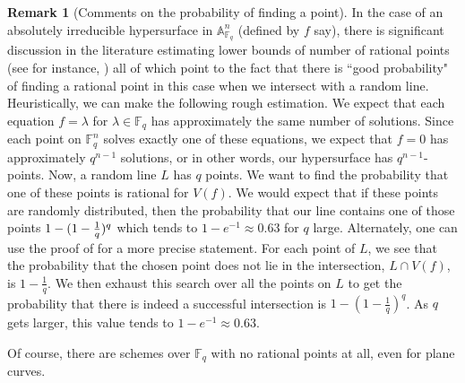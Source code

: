 \documentclass[11pt]{amsart}
\theoremstyle{definition}
\newtheorem{remark}{Remark}[subsection]
\newcommand{\bA}{\mathbb{A}}
\newcommand{\bF}{\mathbb{F}}
\begin{document}
\begin{remark}[Comments on the probability of finding a point]
	In the case of an absolutely irreducible hypersurface in $\bA^n_{\bF_q}$ (defined by $f$ say), there is significant discussion in the literature estimating lower bounds of number of rational points (see for instance, \cite{RationalKPointsSource,lang1954number,ghorpade2002number,cafure2006improved}) all of which point to the fact that there is ``good probability" of finding a rational point in this case when we intersect with a random line. Heuristically, we can make the following rough estimation.  We expect that each equation $f = \lambda$ for $\lambda \in \bF_q$ has approximately the same number of solutions.  Since each point on $\bF_q^n$ solves exactly one of these equations, we expect that $f = 0$ has approximately $q^{n-1}$ solutions, or in other words, our hypersurface has $q^{n-1}$-points.  
       Now, a random line $L$ has $q$ points. We want to find the probability that one of these points is  rational for $V(f)$.  We would expect that if these points are randomly distributed, then the probability that our line contains one of those points $1-(1-{1 \over q})^q$ which tends to $1-e^{-1} \approx 0.63$ for $q$ large.   Alternately, one can use the proof of \cite[Proposition 2.12]{bothmer2005quick} for a more precise statement.  For each point of $L$, we see that the probability that  the chosen point does not lie in the intersection, $L\cap V(f)$, is $1-\frac{1}{q}$. We then exhaust this search over all the points on $L$ to get the probability that there is indeed a successful intersection is $1-(1-\frac{1}{q})^{q}$. As $q$ gets larger, this value tends to $1-e^{-1}\approx 0.63$.

       Of course, there are schemes over $\bF_q$ with no rational points at all, even for plane curves.
\end{remark}
\end{document}
